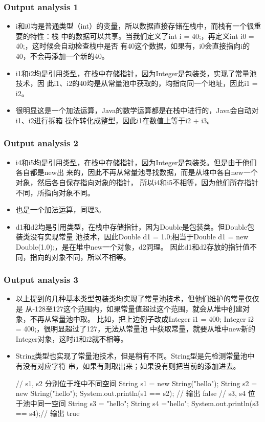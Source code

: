 \documentclass[hyperref={pdfpagelabels=false},compress,table]{beamer} %
\newcommand{\kai}{\CJKfamily{KaiTi}}
\def\Red{\color{red}}
\def\Blue{\color{blue}}
\begin{document}
\begin{frame}[fragile] %
\frametitle{Output analysis 1}\kai
\begin{itemize}
\item i和i0均是普通类型（int）的变量，所以数据直接存储在栈中，而栈有一个很重要的特性：{\Blue 栈
  中的数据可以共享}。当我们定义了int i = 40;，再定义int i0 = 40;，这时候会自动检查栈中是否
  有40这个数据，如果有，i0会直接指向i的40，不会再添加一个新的40。
\item i1和i2均是引用类型，在栈中存储指针，因为Integer是包装类，实现了常量池技术，因
  此i1、i2的40均是从常量池中获取的，均指向同一个地址，因此i1 = i2。
\item 很明显这是一个加法运算，Java的数学运算都是在栈中进行的，Java会自动对i1、i2进行拆箱
  操作转化成整型，因此i1在数值上等于i2 + i3。
\end{itemize}
\end{frame}

\begin{frame}[fragile] %
\frametitle{Output analysis 2}
\begin{itemize}\kai
\item i4和i5均是引用类型，在栈中存储指针，因为Integer是包装类。但是由于他们各自都是new出
  来的，因此不再从常量池寻找数据，而是从堆中各自new一个对象，然后各自保存指向对象的指针，
  所以i4和i5不相等，因为他们所存指针不同，所指向对象不同。
\item 也是一个加法运算，同理3。
\item d1和d2均是引用类型，在栈中存储指针，因为Double是包装类。但{\Red Double包装类没有实现常量
  池技术}，因此Double d1 = 1.0;相当于Double d1 = new Double(1.0);，是在堆中new一个对象，d2同理。
  因此d1和d2存放的指针值不同，指向的对象不同，所以不相等。
\end{itemize}
\end{frame}

\begin{frame}[fragile] %
\frametitle{Output analysis 3}
\begin{itemize}\kai
\item 以上提到的几种基本类型包装类均实现了常量池技术，但他们{\Red 维护的常量仅仅是
    从-128至127这个范围内}，如果常量值超过这个范围，就会从堆中创建对象，不再从常量池中取。
  比如，把上边例子改成Integer i1 = 400; Integer i2 = 400;，很明显超过了127，无法从常量池
  中获取常量，就要从堆中new新的Integer对象，这时i1和i2就不相等。
\item String类型也实现了常量池技术，但是稍有不同。String型是先检测常量池中有没有对应字符
  串，如果有则取出来；如果没有则把当前的添加进去。
\begin{javaCode}
// s1, s2 分别位于堆中不同空间
String s1 = new String("hello");
String s2 = new String("hello");
System.out.println(s1 == s2); // 输出 false
// s3, s4 位于池中同一空间
String s3 = "hello";
String s4 ="hello";
System.out.println(s3 == s4);// 输出 true
\end{javaCode}
\end{itemize}
\end{frame}
\end{document}

